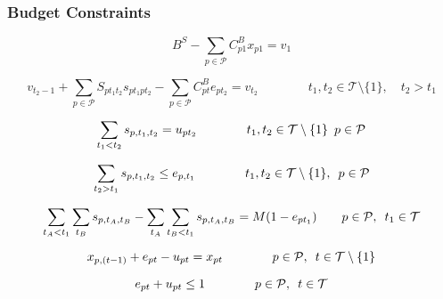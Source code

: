 \subsubsection{Budget Constraints}

\begin{equation} 
    B^{S} - \sum_{p \in \mathcal{P}} C_{p1}^{B}x_{p1} = v_{1}
\end{equation}

\begin{equation} 
    v_{t_{2}-1} + \sum_{p \in \mathcal{P}}S_{pt_{1}t_{2}}s_{pt_{1}pt_{2}} - \sum_{p \in \mathcal{P}}C_{pt}^{B}e_{pt_{2}} = v_{t_{2}} \qquad\qquad t_{1}, t_{2} \in \mathcal{T}\setminus\{1\}, \quad t_{2} > t_{1}
\end{equation}

\begin{equation}
\sum_{t_{1} < t_{2}} s_{p,t_{1},t_{2}} = u_{pt_{2}}    \qquad\qquad t_{1}, t_{2} \in \mathcal{T}\setminus\{1\} \enskip p \in \mathcal{P}
\end{equation}

\begin{equation}
    \sum_{t_{2} > t_{1}} s_{p,t_{1},t_{2}} \leq e_{p,t_{1}} \qquad\qquad t_{1}, t_{2} \in \mathcal{T}\setminus\{1\}, \enskip p \in \mathcal{P}
\end{equation}

\begin{equation}
    \sum_{t_{A} < t_{1}} \sum_{t_{B}} s_{p,t_{A},t_{B}} -     \sum_{t_{A}} \sum_{t_{B} < t_{1}} s_{p,t_{A},t_{B}} = M(1-e_{pt_{1}}) \quad\quad p \in \mathcal{P}, \enskip t_{1} \in \mathcal{T}
\end{equation}

\begin{equation} 
  x_{p,(t-1)} + e_{pt} - u_{pt} = x_{pt} \qquad\qquad p \in \mathcal{P}, \enskip t \in \mathcal{T}\setminus\{1\} 
\end{equation}

\begin{equation} 
   e_{pt} + u_{pt} \leq 1  \qquad\qquad p \in \mathcal{P}, \enskip t \in \mathcal{T} 
\end{equation}